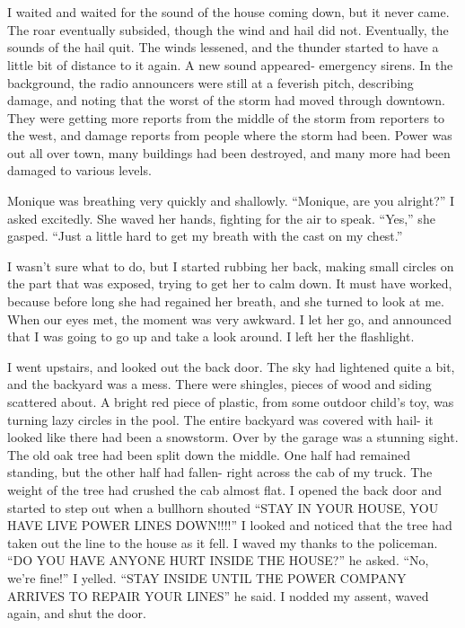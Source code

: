 \chapter{~}
I waited and waited for the sound of the house coming down, but it never came. The roar
eventually subsided, though the wind and hail did not. Eventually, the sounds of the hail quit.
The winds lessened, and the thunder started to have a little bit of distance to it again. A new
sound appeared- emergency sirens. In the background, the radio announcers were still at a
feverish pitch, describing damage, and noting that the worst of the storm had moved through
downtown. They were getting more reports from the middle of the storm from reporters to the
west, and damage reports from people where the storm had been. Power was out all over town, many
buildings had been destroyed, and many more had been damaged to various levels.

Monique was breathing very quickly and shallowly. ``Monique, are you alright?'' I asked
excitedly. She waved her hands, fighting for the air to speak. ``Yes,'' she gasped. ``Just a
little hard to get my breath with the cast on my chest.''

I wasn't sure what to do, but I started rubbing her back, making small circles on the part
that was exposed, trying to get her to calm down. It must have worked, because before long she
had regained her breath, and she turned to look at me. When our eyes met, the moment was very
awkward. I let her go, and announced that I was going to go up and take a look around. I left
her the flashlight.

I went upstairs, and looked out the back door. The sky had lightened quite a bit, and the
backyard was a mess. There were shingles, pieces of wood and siding scattered about. A bright
red piece of plastic, from some outdoor child's toy, was turning lazy circles in the pool. The
entire backyard was covered with hail- it looked like there had been a snowstorm. Over by the
garage was a stunning sight. The old oak tree had been split down the middle. One half had
remained standing, but the other half had fallen- right across the cab of my truck. The weight
of the tree had crushed the cab almost flat. I opened the back door and started to step out when
a bullhorn shouted ``STAY IN YOUR HOUSE, YOU HAVE LIVE POWER LINES DOWN!!!!'' I looked and
noticed that the tree had taken out the line to the house as it fell. I waved my thanks to the
policeman. ``DO YOU HAVE ANYONE HURT INSIDE THE HOUSE?'' he asked. ``No, we're fine!'' I yelled.
``STAY INSIDE UNTIL THE POWER COMPANY ARRIVES TO REPAIR YOUR LINES'' he said. I nodded my
assent, waved again, and shut the door.

